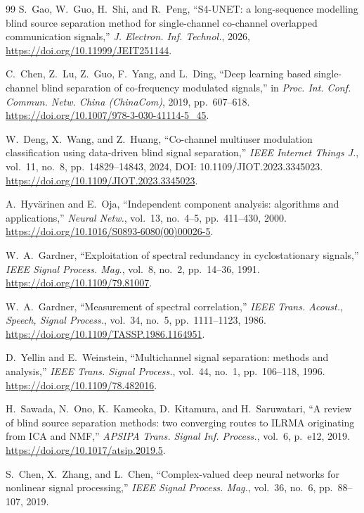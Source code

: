 \documentclass[twocolumn,english]{svjour3}
\begin{document}
\begin{thebibliography}{99}
S.~Gao, W.~Guo, H.~Shi, and R.~Peng,
``S4-UNET: a long-sequence modelling blind source separation method for single-channel co-channel overlapped communication signals,''
\emph{J. Electron. Inf. Technol.}, 2026, \url{https://doi.org/10.11999/JEIT251144}.

C.~Chen, Z.~Lu, Z.~Guo, F.~Yang, and L.~Ding,
``Deep learning based single-channel blind separation of co-frequency modulated signals,''
in \emph{Proc. Int. Conf. Commun. Netw. China (ChinaCom)}, 2019, pp.~607--618. \url{https://doi.org/10.1007/978-3-030-41114-5_45}.

W.~Deng, X.~Wang, and Z.~Huang,
``Co-channel multiuser modulation classification using data-driven blind signal separation,''
\emph{IEEE Internet Things J.}, vol.~11, no.~8, pp.~14829--14843, 2024, DOI: 10.1109/JIOT.2023.3345023. \url{https://doi.org/10.1109/JIOT.2023.3345023}.

A.~Hyv{\"a}rinen and E.~Oja,
``Independent component analysis: algorithms and applications,''
\emph{Neural Netw.}, vol.~13, no.~4--5, pp.~411--430, 2000. \url{https://doi.org/10.1016/S0893-6080(00)00026-5}.

W.~A.~Gardner,
``Exploitation of spectral redundancy in cyclostationary signals,''
\emph{IEEE Signal Process. Mag.}, vol.~8, no.~2, pp.~14--36, 1991. \url{https://doi.org/10.1109/79.81007}.

W.~A.~Gardner,
``Measurement of spectral correlation,''
\emph{IEEE Trans. Acoust., Speech, Signal Process.}, vol.~34, no.~5, pp.~1111--1123, 1986. \url{https://doi.org/10.1109/TASSP.1986.1164951}.

D.~Yellin and E.~Weinstein,
``Multichannel signal separation: methods and analysis,''
\emph{IEEE Trans. Signal Process.}, vol.~44, no.~1, pp.~106--118, 1996. \url{https://doi.org/10.1109/78.482016}.

H.~Sawada, N.~Ono, K.~Kameoka, D.~Kitamura, and H.~Saruwatari,
``A review of blind source separation methods: two converging routes to ILRMA originating from ICA and NMF,''
\emph{APSIPA Trans. Signal Inf. Process.}, vol.~6, p.~e12, 2019. \url{https://doi.org/10.1017/atsip.2019.5}.

S.~Chen, X.~Zhang, and L.~Chen,
``Complex-valued deep neural networks for nonlinear signal processing,''
\emph{IEEE Signal Process. Mag.}, vol.~36, no.~6, pp.~88--107, 2019.


\end{thebibliography}
\end{document}
